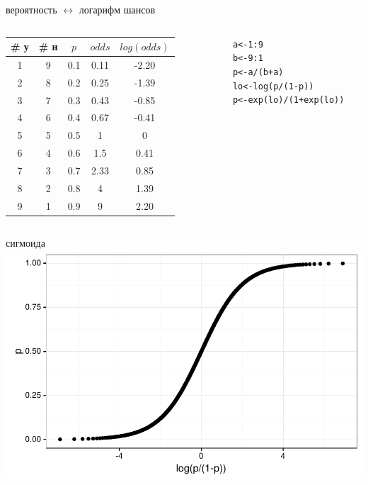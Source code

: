 \begin{frame}{вероятность $\longleftrightarrow$ логарифм шансов}
\begin{columns}[T] 
\begin{column}{.48\textwidth}
\begin{tabular}{c|c|c|c|c}
\# у & \# н & $p$ & $odds$ & $log(odds)$ \\ \hline
1 & 9 & 0.1 & 0.11 & -2.20 \\ \hline
2 & 8 & 0.2 & 0.25 & -1.39 \\ \hline
3 & 7 & 0.3 & 0.43 & -0.85 \\ \hline
4 & 6 & 0.4 & 0.67 & -0.41 \\ \hline
5 & 5 & 0.5 & 1& 0 \\ \hline
6 & 4 & 0.6 & 1.5 & 0.41 \\ \hline
7 & 3 & 0.7 & 2.33 & 0.85 \\ \hline
8 & 2 & 0.8 & 4 & 1.39 \\ \hline
9 & 1 & 0.9 & 9 & 2.20 \\
\end{tabular}
\end{column}
\hfill
\begin{column}{.48\textwidth}
\scriptsize
\begin{alltt}
~~~~~a <- 1:9\\
~~~~~b <- 9:1\\
~~~~~p <- a/(b+a)\\
~~~~~\alert{lo <- log(p/(1-p))}\bigskip\\
~~~~~\alert{p <- exp(lo)/(1 + exp(lo))}
\end{alltt}
\normalsize
\end{column}
\end{columns}
\end{frame}
\begin{frame}{сигмоида}
\includegraphics[width=\linewidth]{sigmoid.pdf}
\end{frame}
